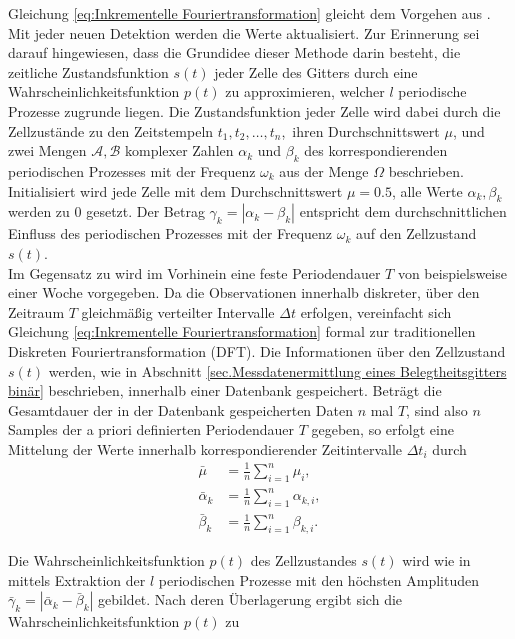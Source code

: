 Gleichung \ref{eq:Inkrementelle Fouriertransformation} gleicht dem Vorgehen aus \cite{Krajnik.2015}. Mit jeder neuen Detektion werden die Werte aktualisiert. Zur Erinnerung sei darauf hingewiesen, dass die Grundidee dieser Methode darin besteht, die zeitliche Zustandsfunktion $s(t)$ jeder Zelle des Gitters durch eine Wahrscheinlichkeitsfunktion $p(t)$ zu approximieren, welcher $l$ periodische Prozesse zugrunde liegen. Die Zustandsfunktion jeder Zelle wird dabei durch die Zellzustände zu den Zeitstempeln $t_1, t_2, \dots , t_n$,\, ihren Durchschnittswert $\mu$, und zwei Mengen $\mathcal{A}, \mathcal{B}$ komplexer Zahlen $\alpha_k$ und $\beta_k$ des korrespondierenden periodischen Prozesses mit der Frequenz $\omega_k$ aus der Menge $\Omega$ beschrieben. Initialisiert wird jede Zelle mit dem Durchschnittswert $\mu = 0.5$, alle Werte $\alpha_k, \beta_k$ werden zu 0 gesetzt. Der Betrag $\gamma_k = |\alpha_k - \beta_k |$ entspricht dem durchschnittlichen Einfluss des periodischen Prozesses mit der Frequenz $\omega_k$ auf den Zellzustand $s(t)$. \\
Im Gegensatz zu \cite{Krajnik.2015} wird im Vorhinein eine feste Periodendauer $T$ von beispielsweise einer Woche vorgegeben. Da die Observationen innerhalb diskreter, über den Zeitraum $T$ gleichmäßig verteilter Intervalle $\Delta t$ erfolgen, vereinfacht sich Gleichung \ref{eq:Inkrementelle Fouriertransformation} formal zur traditionellen Diskreten Fouriertransformation (DFT). Die Informationen über den Zellzustand $s(t)$ werden, wie in Abschnitt \ref{sec.Messdatenermittlung eines Belegtheitsgitters binär} beschrieben, innerhalb einer Datenbank gespeichert. Beträgt die Gesamtdauer der in der Datenbank gespeicherten Daten $n$ mal $T$, sind also $n$ Samples der a priori definierten Periodendauer $T$ gegeben, so erfolgt eine Mittelung der Werte innerhalb korrespondierender Zeitintervalle $\Delta t_i$ durch \\

\begin{equation}\label{eq:Mittelung Fourierkoeffizienten}
	\begin{split}
		\bar{\mu} &= \frac{1}{n} \sum_{i=1}^{n} \mu_i ,	\\
		\bar{\alpha}_k &= \frac{1}{n} \sum_{i=1}^{n} \alpha_{k,i} ,\\
		\bar{\beta}_k &= \frac{1}{n} \sum_{i=1}^{n} \beta_{k,i} .
	\end{split}
\end{equation} 

Die Wahrscheinlichkeitsfunktion $p(t)$ des Zellzustandes $s(t)$ wird wie in \cite{Krajnik.2015} mittels Extraktion der $l$ periodischen Prozesse mit den höchsten Amplituden $\bar{\gamma}_k = | \bar{\alpha}_k - \bar{\beta}_k | $ gebildet. Nach deren Überlagerung ergibt sich die Wahrscheinlichkeitsfunktion $p(t)$ zu

